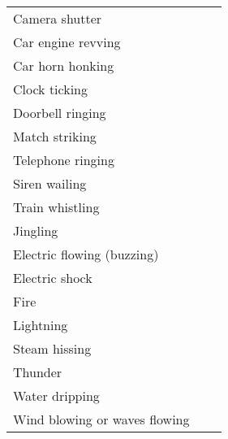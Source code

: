 \begin{longtable}{p{10em}p{5em}p{5em}}
		Camera shutter && \\
		Car engine revving && \\
		Car horn honking && \\
		Clock ticking && \\
		Doorbell ringing && \\
		Match striking && \\
		Telephone ringing && \\
		Siren wailing && \\
		Train whistling && \\
		Jingling && \\
		Electric flowing (buzzing) && \\
		Electric shock && \\
		Fire && \\
		Lightning && \\
		Steam hissing && \\
		Thunder && \\
		Water dripping && \\
		Wind blowing or waves flowing && \\
\end{longtable}